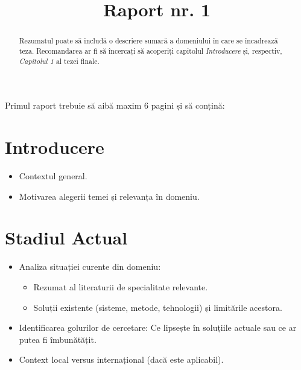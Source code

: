 \documentclass[conference, 10pt]{IEEEtran}
\begin{document}
\title{\thesistitle \\
    {\Large \textbf{Raport nr. 1}}
}

\author{
    \IEEEauthorblockN{\authornamefl}
    \and
}

\maketitle

\begin{abstract}
    Rezumatul poate să includă o descriere sumară a domeniului în care se încadrează teza. Recomandarea ar fi să încercați să acoperiți capitolul \textit{Introducere} și, respectiv, \textit{Capitolul 1} al tezei finale.
\end{abstract}

Primul raport trebuie să aibă maxim 6 pagini și să conțină:

\section{Introducere}
\begin{itemize}
    \item Contextul general.
    \item Motivarea alegerii temei și relevanța în domeniu.
\end{itemize}

\section{Stadiul Actual}
\begin{itemize}
    \item Analiza situației curente din domeniu:
    \begin{itemize}
        \item Rezumat al literaturii de specialitate relevante.
        \item Soluții existente (sisteme, metode, tehnologii) și limitările acestora.
    \end{itemize}
    \item Identificarea golurilor de cercetare: Ce lipsește în soluțiile actuale sau ce ar putea fi îmbunătățit.
    \item Context local versus internațional (dacă este aplicabil).
\end{itemize}
\end{document}
